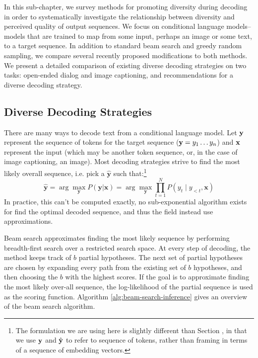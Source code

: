 In this sub-chapter, we survey methods for promoting diversity during decoding in order to systematically investigate the relationship between diversity and perceived quality of output sequences.
We focus on conditional language models--models that are trained to map from some input, perhaps an image or some text, to a target sequence.
In addition to standard beam search and greedy random sampling, we compare several recently proposed modifications to both methods.
We present a detailed comparison of existing diverse decoding strategies on two tasks: open-ended dialog and image captioning, and recommendations for a diverse decoding strategy.

\subsection{Diverse Decoding Strategies}
There are many ways to decode text from a conditional language model.
Let $\mathbf{y}$ represent the sequence of tokens for the target sequence ($\mathbf{y} = y_1 \ldots y_n$) and $\mathbf{x}$ represent the input (which may be another token sequence, or, in the case of image captioning, an image).
Most decoding strategies strive to find the most likely overall sequence, i.e. pick a $\mathbf{\hat{y}}$ such that:\footnote{The formulation we are using here is slightly different than Section \TODO{}, in that we use $\mathbf{y}$ and $\hat{\mathbf{y}}$ to refer to sequence of tokens, rather than framing in terms of a sequence of embedding vectors.}
\[
    \mathbf{\hat{y}} = \arg\max_{\mathbf{y}}{ P(\mathbf{y} | \mathbf{x})} = \arg\max_{\mathbf{y}}{\prod_{t=1}^{N} {P(y_t \mid y_{<t}, \mathbf{x})}}
\]
In practice, this can't be computed exactly, no sub-exponential algorithm exists for find the optimal decoded sequence, and thus the field instead use approximations.

Beam search approximates finding the most likely sequence by performing breadth-first search over a restricted search space.
At every step of decoding, the method keeps track of $b$ partial hypotheses.
The next set of partial hypotheses are chosen by expanding every path from the existing set of $b$ hypotheses, and then choosing the $b$ with the highest scores.
If the goal is to approximate finding the most likely over-all sequence, the log-likelihood of the partial sequence is used as the scoring function.
Algorithm \ref{alg:beam-search-inference} gives an overview of the beam search algorithm. 

